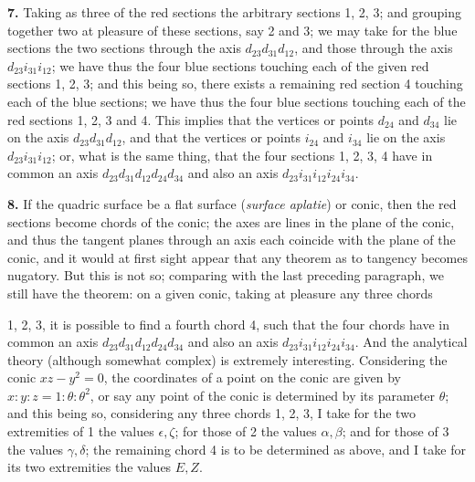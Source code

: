 \documentclass[11pt]{article}
\begin{document}
\medskip
\noindent\textbf{7.} Taking as three of the red sections the arbitrary sections 1, 2, 3; and grouping together two at pleasure of these sections, say 2 and 3; we may take for the blue sections the two sections through the axis $d_{23}d_{31}d_{12}$, and those through the axis $d_{23}i_{31}i_{12}$; we have thus the four blue sections touching each of the given red sections 1, 2, 3; and this being so, there exists a remaining red section 4 touching each of the blue sections; we have thus the four blue sections touching each of the red sections 1, 2, 3 and 4. This implies that the vertices or points $d_{24}$ and $d_{34}$ lie on the axis $d_{23}d_{31}d_{12}$, and that the vertices or points $i_{24}$ and $i_{34}$ lie on the axis $d_{23}i_{31}i_{12}$; or, what is the same thing, that the four sections 1, 2, 3, 4 have in common an axis $d_{23}d_{31}d_{12}d_{24}d_{34}$ and also an axis $d_{23}i_{31}i_{12}i_{24}i_{34}$.

\medskip
\noindent\textbf{8.} If the quadric surface be a flat surface (\textit{surface aplatie}) or conic, then the red sections become chords of the conic; the axes are lines in the plane of the conic, and thus the tangent planes through an axis each coincide with the plane of the conic, and it would at first sight appear that any theorem as to tangency becomes nugatory. But this is not so; comparing with the last preceding paragraph, we still have the theorem: on a given conic, taking at pleasure any three chords

1, 2, 3, it is possible to find a fourth chord 4, such that the four chords have in common an axis $d_{23}d_{31}d_{12}d_{24}d_{34}$ and also an axis $d_{23}i_{31}i_{12}i_{24}i_{34}$. And the analytical theory (although somewhat complex) is extremely interesting. Considering the conic $xz - y^2 = 0$, the coordinates of a point on the conic are given by $x : y : z = 1 : \theta : \theta^2$, or say any point of the conic is determined by its parameter $\theta$; and this being so, considering any three chords 1, 2, 3, I take for the two extremities of 1 the values $\epsilon, \zeta$; for those of 2 the values $\alpha, \beta$; and for those of 3 the values $\gamma, \delta$; the remaining chord 4 is to be determined as above, and I take for its two extremities the values $E, Z$.
\end{document}
